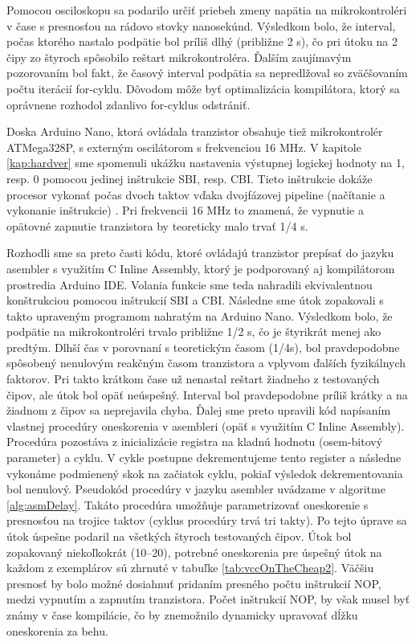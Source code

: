Pomocou osciloskopu sa podarilo určiť priebeh zmeny napätia na mikrokontroléri v čase s presnosťou na rádovo stovky nanosekúnd. Výsledkom bolo, že interval, počas ktorého nastalo podpätie bol príliš dlhý (približne 2 {\textmu}s), čo pri útoku na 2 čipy zo štyroch spôsobilo reštart mikrokontroléra. Ďalším zaujímavým pozorovaním bol fakt, že časový interval podpätia sa nepredlžoval so zväčšovaním počtu iterácií  for-cyklu. Dôvodom môže byť optimalizácia kompilátora, ktorý sa oprávnene rozhodol zdanlivo  for-cyklus odstrániť.

Doska Arduino Nano, ktorá ovládala tranzistor obsahuje tiež mikrokontrolér ATMega328P, s externým oscilátorom s frekvenciou 16 MHz. V kapitole \ref{kap:hardver} sme spomenuli ukážku nastavenia výstupnej logickej hodnoty na 1, resp. 0 pomocou jedinej inštrukcie SBI, resp. CBI. Tieto inštrukcie dokáže procesor vykonať počas dvoch taktov vďaka dvojfázovej pipeline (načítanie a vykonanie inštrukcie) \cite{atmegaData}. Pri frekvencii 16 MHz to znamená, že vypnutie a opätovné zapnutie tranzistora by teoreticky malo trvať 1/4 {\textmu}s. 

Rozhodli sme sa preto časti kódu, ktoré ovládajú tranzistor prepísať do jazyku asembler s využitím C Inline Assembly, ktorý je podporovaný aj kompilátorom prostredia Arduino IDE. Volania funkcie  sme teda nahradili ekvivalentnou konštrukciou pomocou inštrukcií SBI a CBI. Následne sme útok zopakovali s takto upraveným programom nahratým na Arduino Nano. Výsledkom bolo, že podpätie na mikrokontroléri trvalo približne 1/2 {\textmu}s, čo je štyrikrát menej ako predtým. Dlhší čas v porovnaní s teoretickým časom (1/4{\textmu}s), bol pravdepodobne spôsobený nenulovým reakčným časom tranzistora a vplyvom ďalších fyzikálnych faktorov. Pri takto krátkom čase už nenastal reštart žiadneho z testovaných čipov, ale útok bol opäť neúspešný. Interval bol pravdepodobne príliš krátky a na žiadnom z čipov sa neprejavila chyba. Ďalej sme preto upravili kód napísaním vlastnej procedúry oneskorenia v asembleri (opäť s využitím C Inline Assembly). Procedúra pozostáva z inicializácie registra na kladnú hodnotu (osem-bitový parameter) a cyklu. V cykle postupne dekrementujeme tento register a následne vykonáme podmienený skok na začiatok cyklu, pokiaľ výsledok dekrementovania bol nenulový. Pseudokód procedúry v jazyku asembler uvádzame v algoritme \ref{alg:asmDelay}. Takáto procedúra umožňuje parametrizovať oneskorenie s presnosťou na trojice taktov (cyklus procedúry trvá tri takty). Po tejto úprave sa útok úspešne podaril na všetkých štyroch testovaných čipov. Útok bol zopakovaný niekoľkokrát (10--20), potrebné oneskorenia pre úspešný útok na každom z exemplárov sú zhrnuté v tabuľke \ref{tab:vccOnTheCheap2}. Väčšiu presnosť by bolo možné dosiahnuť pridaním presného počtu inštrukcií NOP, medzi vypnutím a zapnutím tranzistora. Počet inštrukcií NOP, by však musel byť známy v čase kompilácie, čo by znemožnilo dynamicky upravovať dĺžku oneskorenia za behu.

